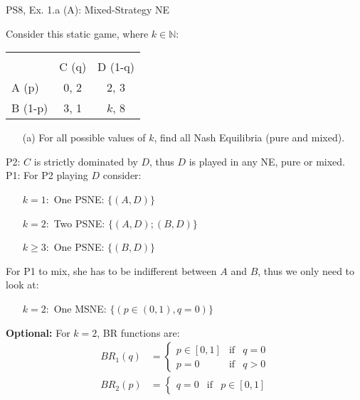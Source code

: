 \begin{frame}{PS8, Ex. 1.a (A): Mixed-Strategy NE}
    \begin{multicols}{2}
      Consider this static game, where $k\in\mathbb{N}:$
      \vspace{-16pt}
      \begin{table}
        \begin{tabular}{l|c|c|}
          \multicolumn{1}{c}{} & \multicolumn{2}{c}{} \\
          \multicolumn{1}{c}{} & \multicolumn{1}{c}{C (q)} & \multicolumn{1}{c}{\color{blue}D (1-q)} \\\cline{2-3}
          A (p)   & 0, 2 & 2, \color{blue}3 \\\cline{2-3}
          B (1-p) & 3, 1 & $k$, \color{blue}8 \\\cline{2-3}
        \end{tabular}
      \end{table}
      \begin{itemize}
        \item[(a)] For all possible values of $k$, find all Nash Equilibria (pure and mixed).
      \end{itemize}
      P2: $C$ is strictly dominated by $D$, thus $D$ is played in any NE, pure or mixed.\\\medskip
      P1: For P2 playing $D$ consider:
      \begin{itemize}
        \item[$k=1:$] One PSNE: $\{(A,D)\}$
        \item[$k=2:$] Two PSNE: $\{(A,D);(B,D)\}$
        \item[$k\geq3:$] One PSNE: $\{(B,D)\}$
      \end{itemize}
      For P1 to mix, she has to be indifferent between $A$ and $B$, thus we only need to look at:
      \begin{itemize}
        \item[$k=2:$] One MSNE: $\{(p\in(0,1),q=0)\}$
      \end{itemize}
      \vfill\null\columnbreak
      \textbf{Optional:} For $k=2$, BR functions are:
      \vspace{-8pt}
      \begin{align*}
        BR_1(q)&=\left\{ \begin{array}{lcl}
            p\in[0,1] & \text{if} & q=0 \\
            p=0       & \text{if} & q>0
        \end{array}\right. \\
        BR_2(p)&=\left\{ \begin{array}{lcl}
            q=0       & \text{if} & p\in[0,1]
        \end{array}\right.
      \end{align*}
      \vfill\null
    \end{multicols}
\end{frame}
